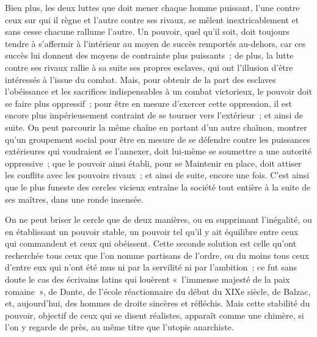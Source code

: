 \documentclass[french,twoside]{book} %
\begin{document}
Bien plus, les deux luttes que doit mener chaque homme puissant, l'une contre ceux sur qui il règne et l'autre contre ses rivaux, se mêlent inextricablement et sans cesse chacune rallume l'autre. Un pouvoir, quel qu'il soit, doit toujours tendre à s'affermir à l'intérieur au moyen de succès remportés au-dehors, car ces succès lui donnent des moyens de contrainte plus puissants ; de plus, la lutte contre ses rivaux rallie à sa suite ses propres esclaves, qui ont l'illusion d'être intéressés à l'issue du combat. Mais, pour obtenir de la part des esclaves l'obéissance et les sacrifices indispensables à un combat victorieux, le pouvoir doit se faire plus oppressif ; pour être en mesure d'exercer cette oppression, il est encore plus impérieusement contraint de se tourner vers l'extérieur ; et ainsi de suite. On peut parcourir la même chaîne en partant d'un autre chaînon, montrer qu'un groupement social pour être en mesure de se défendre contre les puissances extérieures qui voudraient se l'annexer, doit lui-même se soumettre a une autorité oppressive ; que le pouvoir ainsi établi, pour se Maintenir en place, doit attiser les conflits avec les pouvoirs rivaux ; et ainsi de suite, encore une fois. C'est ainsi que le plus funeste des cercles vicieux entraîne la société tout entière à la suite de ses maîtres, dans une ronde insensée.\par
On ne peut briser le cercle que de deux manières, ou en supprimant l'inégalité, ou en établissant un pouvoir stable, un pouvoir tel qu'il y ait équilibre entre ceux qui commandent et ceux qui obéissent. Cette seconde solution est celle qu'ont recherchée tous ceux que l'on nomme partisans de l'ordre, ou du moins tous ceux d'entre eux qui n'ont été mus ni par la servilité ni par l'ambition ; ce fut sans doute le cas des écrivains latins qui louèrent « l'immense majesté de la paix romaine », de Dante, de l'école réactionnaire du début du XIXe siècle, de Balzac, et, aujourd'hui, des hommes de droite sincères et réfléchis. Mais cette stabilité du pouvoir, objectif de ceux qui se disent réalistes, apparaît comme une chimère, si l'on y regarde de près, au même titre que l'utopie anarchiste.\par
\end{document}
